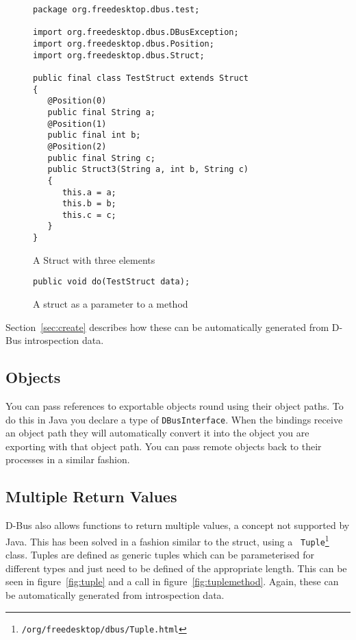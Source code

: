 \documentclass[a4paper,12pt]{article}
\begin{document}
\begin{figure}[htb]
\begin{center}
\begin{verbatim}
package org.freedesktop.dbus.test;

import org.freedesktop.dbus.DBusException;
import org.freedesktop.dbus.Position;
import org.freedesktop.dbus.Struct;

public final class TestStruct extends Struct
{
   @Position(0)
   public final String a;
   @Position(1)
   public final int b;
   @Position(2)
   public final String c;
   public Struct3(String a, int b, String c)
   {
      this.a = a;
      this.b = b;
      this.c = c;
   }
}
\end{verbatim}
\end{center}
\caption{A Struct with three elements}
\label{fig:struct}
\end{figure}

\begin{figure}[htb]
\begin{center}
\begin{verbatim}
public void do(TestStruct data);
\end{verbatim}
\end{center}
\caption{A struct as a parameter to a method}
\label{fig:structmethod}
\end{figure}


Section~\ref{sec:create} describes how these can be automatically
generated from D-Bus introspection data.

\subsection{Objects}

You can pass references to exportable objects round using their object paths.
To do this in Java you declare a type of {\tt DBusInterface}. When the bindings
receive an object path they will automatically convert it into the object you
are exporting with that object path. You can pass remote objects back to their
processes in a similar fashion.


\subsection{Multiple Return Values}

D-Bus also allows functions to return multiple values, a concept not supported
by Java. This has been solved in a fashion similar to the struct, using a {\tt
Tuple\footnote{\javadocroot/org/freedesktop/dbus/Tuple.html}}
class. Tuples are defined as generic tuples which can be parameterised for
different types and just need to be defined of the appropriate length. This can
be seen in figure~\ref{fig:tuple} and a call in figure~\ref{fig:tuplemethod}.
Again, these can be automatically generated from introspection data.
\end{document}
